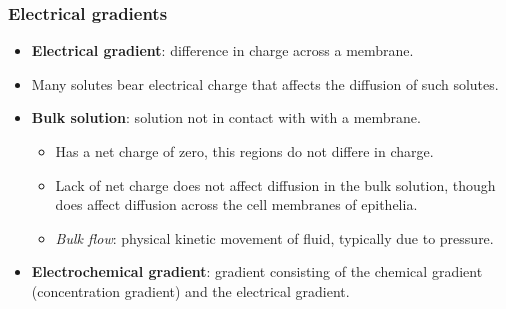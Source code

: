 \documentclass[12pt,a4paper]{article}
\begin{document}
    \subsubsection{Electrical gradients}
    \begin{itemize}
        \item \textbf{Electrical gradient}: difference in charge across a membrane.
        \item Many solutes bear electrical charge that affects the diffusion of such solutes.
        \item \textbf{Bulk solution}: solution not in contact with with a membrane.
            \begin{itemize}
                \item Has a net charge of zero, this regions do not differe in charge.
                \item Lack of net charge does not affect diffusion in the bulk solution, though does affect diffusion across the cell membranes of epithelia.
                \item \textit{Bulk flow}: physical kinetic movement of fluid, typically due to pressure.
            \end{itemize}
        \item \textbf{Electrochemical gradient}: gradient consisting of the chemical gradient (concentration gradient) and the electrical gradient.   
    \end{itemize}
\end{document}
